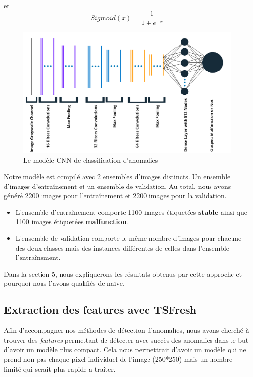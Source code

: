 \documentclass[french]{article}
\theoremstyle{mytheoremstyle}
\theoremstyle{mytheoremstyle}
\theoremstyle{myproblemstyle}
\begin{document}
        et
        \[
        Sigmoid(x) = \dfrac{1}{1+e^{-x}}
        \]
        \begin{figure}[H]
            \centering
            \includegraphics[width=\textwidth]{images/cnn.png}
            \caption{Le modèle CNN de classification d'anomalies}
            \label{}
        \end{figure}
        Notre modèle est compilé avec 2 ensembles d'images distincts. Un ensemble d'images d'entraînement et un ensemble de validation. Au total, nous avons généré 2200 images pour l'entraînement et 2200 images pour la validation.
        \newline
        \begin{itemize}
            \item L'ensemble d'entraînement comporte 1100 images étiquetées \textbf{stable} ainsi que 1100 images étiquetées \textbf{malfunction}.
            \item L'ensemble de validation comporte le même nombre d'images pour chacune des deux classes mais des instances différentes de celles dans l'ensemble l'entraînement.
        \end{itemize}
        Dans la section 5, nous expliquerons les résultats obtenus par cette approche et pourquoi nous l'avons qualifiés de naïve.
        \subsection{Extraction des features avec TSFresh}
        Afin d'accompagner nos méthodes de détection d'anomalies, nous avons cherché à trouver des \emph{features} permettant de détecter avec succès des anomalies dans le but d'avoir un modèle plus compact. Cela nous permettrait d'avoir un modèle qui ne prend non pas chaque pixel individuel de l'image (250*250) mais un nombre limité qui serait plus rapide a traiter. 
        
\end{document}
